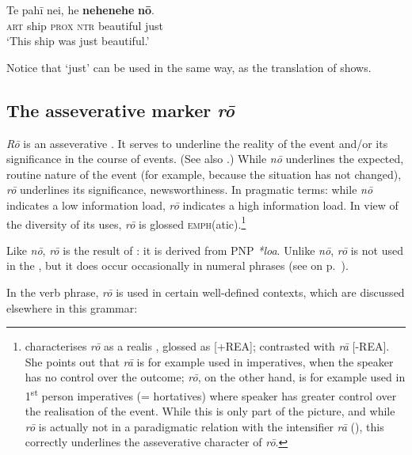 \ea\label{ex:7.113}
\gll Te pahī nei, he \textbf{nehenehe} \textbf{nō}. \\
\textsc{art} ship \textsc{prox} \textsc{ntr} beautiful just \\

\glt
‘This ship was just beautiful.’ \textstyleExampleref{[R239.022]} 
\z

Notice that  ‘just’ can be used in the same way, as the translation of  shows.

\subsection{The asseverative marker \textit{rō}}\label{sec:7.4.2}
\textit{Rō} is an asseverative . It serves to underline the reality of the event and/or its significance in the course of events. (See also \citealt[41]{WeberR2003}.) While \textit{nō} underlines the expected, routine nature of the event (for example, because the situation has not changed), \textit{rō} underlines its significance, newsworthiness. In pragmatic terms: while \textit{nō} indicates a low information load, \textit{rō} indicates a high information load. In view of the diversity of its uses, \textit{rō} is glossed \textsc{emph}(atic).\footnote{\label{fn:348} \citet[37]{DuFeu1996} characterises \textit{rō} as a realis , glossed as [+REA]; contrasted with \textit{rā} [-REA]. She points out that \textit{rā} is for example used in imperatives, when the speaker has no control over the outcome; \textit{rō}, on the other hand, is for example used in 1\textsuperscript{st} person imperatives (= hortatives) where speaker has greater control over the realisation of the event. While this is only part of the picture, and while \textit{rō} is actually not in a paradigmatic relation with the intensifier \textit{rā} (), this correctly underlines the asseverative character of \textit{rō}.}

Like \textit{nō}, \textit{rō} is the result of : it is derived from PNP \textit{*loa}. Unlike \textit{nō}, \textit{rō} is not used in the , but it does occur occasionally in numeral phrases (see  on p.~\pageref{ex:4.28}).

In the verb phrase, \textit{rō} is used in certain well-defined contexts, which are discussed elsewhere in this grammar:

